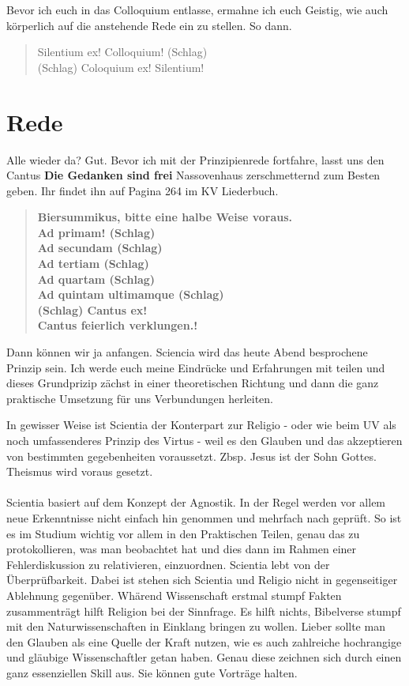 Bevor ich euch in das Colloquium entlasse, ermahne ich euch Geistig,
wie auch körperlich auf die anstehende Rede ein zu stellen. So dann.

\begin{quote}
    Silentium ex! Colloquium! (Schlag)\\
    (Schlag) Coloquium ex! Silentium!
\end{quote}
\newpage
\section{Rede}
Alle wieder da? Gut. Bevor ich mit der Prinzipienrede fortfahre, lasst uns
den Cantus \textbf{Die Gedanken sind frei} Nassovenhaus zerschmetternd zum
Besten geben. Ihr findet ihn auf Pagina 264 im KV Liederbuch.
\begin{quote}
    \textbf{
        Biersummikus, bitte eine halbe Weise voraus.\\
        Ad primam! (Schlag)\\
        Ad secundam (Schlag)\\
        Ad tertiam (Schlag)\\
        Ad quartam (Schlag)\\
        Ad quintam ultimamque (Schlag)\\
        (Schlag) Cantus ex!\\
        Cantus feierlich verklungen.!
    }
\end{quote}
Dann können wir ja anfangen.
Sciencia wird das heute Abend besprochene Prinzip sein. Ich werde euch 
meine Eindrücke und Erfahrungen mit teilen und dieses Grundprizip 
zächst in einer theoretischen Richtung und dann die ganz praktische 
Umsetzung für uns Verbundungen herleiten.

In gewisser Weise ist Scientia der Konterpart zur Religio - 
oder wie beim UV als noch umfassenderes Prinzip des Virtus - 
weil es den Glauben und das akzeptieren von bestimmten gegebenheiten 
voraussetzt. Zbsp. Jesus ist der Sohn Gottes. Theismus wird voraus gesetzt.\\ \\
Scientia basiert auf dem Konzept der Agnostik. In der Regel werden vor allem
neue Erkenntnisse nicht einfach hin genommen und mehrfach nach geprüft.
So ist es im Studium wichtig vor allem in den Praktischen Teilen, genau das zu 
protokollieren, was man beobachtet hat und dies dann im Rahmen einer Fehlerdiskussion
zu relativieren, einzuordnen. Scientia lebt von der Überprüfbarkeit. Dabei ist stehen
sich Scientia und Religio nicht in gegenseitiger Ablehnung gegenüber. Whärend
Wissenschaft erstmal stumpf Fakten zusammenträgt hilft Religion bei der Sinnfrage.
Es hilft nichts, Bibelverse stumpf mit den Naturwissenschaften in Einklang bringen
zu wollen. Lieber sollte man den Glauben als eine Quelle der Kraft nutzen, wie
es auch zahlreiche hochrangige und gläubige Wissenschaftler getan haben. Genau diese
zeichnen sich durch einen ganz essenziellen Skill aus. Sie können gute Vorträge halten.

